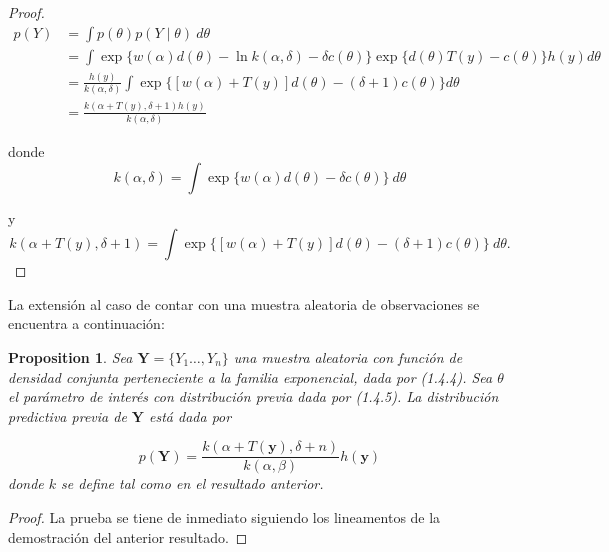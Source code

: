 \documentclass[
  spanish,
  letter]{book}
\newtheorem{proposition}{Proposition}[chapter]
\theoremstyle{definition}
\theoremstyle{definition}
\theoremstyle{definition}
\theoremstyle{remark}
\begin{document}
\begin{proof}
\iffalse{} {Proof. } \fi{}\begin{align*}
p(Y)&=\int p(\theta)p(Y \mid \theta)\ d\theta\\
&=\int \exp\{w(\alpha) d(\theta)-\ln k(\alpha,\delta)-\delta c(\theta)\}\exp\{d(\theta)T(y)-c(\theta)\}h(y)d\theta\\
&=\frac{h(y)}{k(\alpha,\delta)}\int \exp\{[w(\alpha)+T(y)]d(\theta)-(\delta+1)c(\theta)\}d\theta\\
&=\frac{k(\alpha+T(y),\delta+1)h(y)}{k(\alpha,\delta)}
\end{align*}

donde
\begin{equation*}
k(\alpha,\delta)=\int \exp\{w(\alpha) d(\theta)-\delta c(\theta)\}\ d\theta
\end{equation*}

y
\begin{equation*}
k(\alpha+T(y),\delta+1)=\int \exp\{[w(\alpha)+T(y)]d(\theta)-(\delta+1)c(\theta)\} \ d\theta.
\end{equation*}
\end{proof}

La extensión al caso de contar con una muestra aleatoria de observaciones se encuentra a continuación:

\begin{proposition}
\protect\hypertarget{prp:unnamed-chunk-27}{}{\label{prp:unnamed-chunk-27} }Sea \(\mathbf{Y}=\{Y_1\ldots,Y_n\}\) una muestra aleatoria con función de densidad conjunta perteneciente a la familia exponencial, dada por (1.4.4). Sea \(\theta\) el parámetro de interés con distribución \emph{previa} dada por (1.4.5). La distribución predictiva \emph{previa} de \(\mathbf{Y}\) está dada por

\begin{equation}
p(\mathbf{Y})=\frac{k(\alpha+T(\mathbf{y}),\delta+n)}{k(\alpha,\beta)}h(\mathbf{y})
\end{equation}
donde \(k\) se define tal como en el resultado anterior.
\end{proposition}

\begin{proof}
\iffalse{} {Proof. } \fi{}La prueba se tiene de inmediato siguiendo los lineamentos de la demostración del anterior resultado.
\end{proof}
\end{document}
